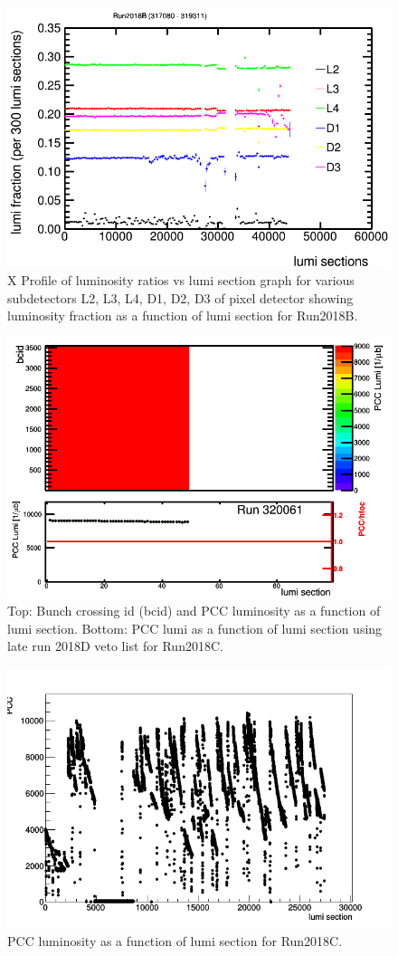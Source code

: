 \begin{figure}[H]
  \centering
  \includegraphics[width=0.5\columnwidth]{./ProfileXcombinedB_new.png}
  \caption{X Profile of luminosity ratios vs lumi section graph for various subdetectors L2, L3, L4, D1, D2, D3 of pixel detector showing luminosity fraction as a function of lumi section for Run2018B.}
  \label{fig:CMS}
\end{figure}



\begin{figure}[H]
  \centering
  \includegraphics[width=0.5\columnwidth]{./320061.png}
  \caption{Top: Bunch crossing id (bcid) and PCC luminosity as a function of lumi section. Bottom: PCC lumi as a function of lumi section using late run 2018D veto list for Run2018C.}
  \label{fig:CMS}
\end{figure}


\begin{figure}[H]
  \centering
  \includegraphics[width=0.5\columnwidth]{./ls_lumi_2018C.png}
  \caption{PCC luminosity as a function of lumi section for Run2018C.}
  \label{fig:CMS}
\end{figure}


